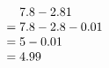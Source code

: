 \documentclass[border=1pt]{standalone}
\begin{document}
{\fontsize{32pt}{40.0pt}\selectfont\color[HTML]{C00000}$\displaystyle \begin{array}{r@{\;}l}&7.8-2.81\\=&7.8-2.8-0.01\\=&5-0.01\\=&4.99\end{array}$}
\end{document}
